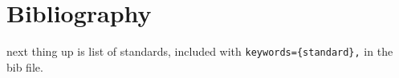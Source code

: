 \documentclass[output=book
  ,nonflat
  ,modfonts,
  ,colorlinks
  ,undecapitalize 
  ,collection
  ,showindex
  ,draftmode
  ,openreview
  ,nobabel
  ,booklanguage=french
  ,oldstylenumbers
  ]{langsci/langscibook}
\begin{document}
% 
% 
%   
% 
% 
% 
% 
% 
% 
% 
% 
% 
% 
% 
% 
%  
%  
% 
% 
% 
% 
% 

\section{Bibliography}

%    

\printbibliography[notkeyword={techreport},notkeyword={website},title={References}] 

next thing up is list of standards, included with \verb+keywords={standard},+ in the bib file. 

\printbibliography[keyword={standard},title={Standards}]
\end{document}

